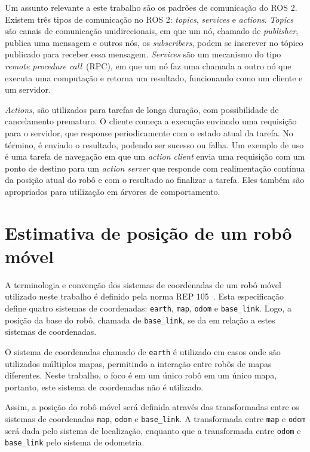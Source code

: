 \documentclass[repeatfields,xlists,xpacks,oneside,yearsonly]{ufrgscca}
\begin{document}
Um assunto relevante a este trabalho são os padrões de comunicação do
ROS 2. Existem três tipos de comunicação no ROS 2: \textit{topics},
\textit{services} e \textit{actions}. \textit{Topics} são canais de
comunicação unidirecionais, em que um nó, chamado de
\textit{publisher}, publica uma mensagem e outros nós, os
\textit{subscribers}, podem se inscrever no tópico publicado para
receber essa mensagem. \textit{Services} são um mecanismo do tipo
\textit{remote procedure call}~(RPC), em que um nó faz uma chamada a
outro nó que executa uma computação e retorna um resultado,
funcionando como um cliente e um servidor.

\textit{Actions}, são utilizados para tarefas de longa duração, com possibilidade de
cancelamento prematuro.
O cliente começa a execução enviando uma requisição para o servidor,
que response periodicamente com o estado atual da tarefa.
No término, é enviado o resultado, podendo ser sucesso ou falha.
Um exemplo de uso é uma tarefa de navegação em que um \textit{action client}
envia uma requisição com um ponto de destino para um \textit{action server}
que responde com realimentação contínua da posição atual do robô e
com o resultado ao finalizar a tarefa.
Eles também são apropriados para utilização em árvores de comportamento.

\section{Estimativa de posição de um robô móvel}

A terminologia e convenção dos sistemas de coordenadas de um robô
móvel utilizado neste trabalho é definido pela norma REP
105~\cite{rep_105}. Esta especificação define quatro sistemas de
coordenadas: \texttt{earth}, \texttt{map}, \texttt{odom} e
\texttt{base\_link}. Logo, a posição da base do robô, chamada de
\texttt{base\_link}, se da em relação a estes sistemas de
coordenadas.

O sistema de coordenadas chamado de \texttt{earth} é utilizado em
casos onde são utilizados múltiplos mapas, permitindo a interação
entre robôs de mapas diferentes. Neste trabalho, o foco é em um único
robô em um único mapa, portanto, este sistema de coordenadas não é
utilizado.

Assim, a posição do robô móvel será definida através das
transformadas entre os sistemas de coordenadas \texttt{map},
\texttt{odom} e \texttt{base\_link}. A transformada entre
\texttt{map} e \texttt{odom} será dada pelo sistema de localização,
enquanto que a transformada entre \texttt{odom} e \texttt{base\_link}
pelo sistema de odometria.
\end{document}
